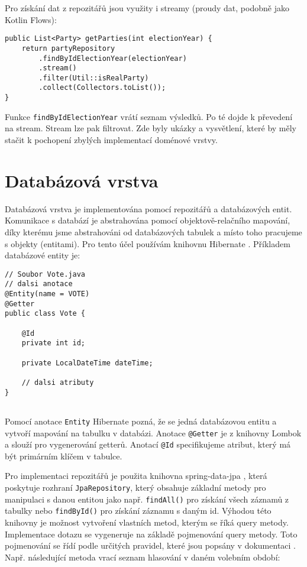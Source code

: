 \noindent Pro získání dat z repozitářů jsou využity i streamy (proudy dat, podobně jako Kotlin Flows):

\begin{lstlisting}[caption={Ukázka použití streamu}, tabsize=2]
public List<Party> getParties(int electionYear) {
	return partyRepository
		.findByIdElectionYear(electionYear)
		.stream()
		.filter(Util::isRealParty)
		.collect(Collectors.toList());
}
\end{lstlisting}

\noindent Funkce \lstinline|findByIdElectionYear| vrátí seznam výsledků. Po té dojde k převedení na stream. Stream lze pak filtrovat. Zde byly ukázky a vysvětlení, které by měly stačit k pochopení zbylých implementací doménové vrstvy.

\section {Databázová vrstva}
Databázová vrstva je implementována pomocí repozitářů a databázových entit. Komunikace \linebreak s databází je abstrahována pomocí objektově-relačního mapování, díky kterému jsme abstrahováni od databázových tabulek a místo toho pracujeme s objekty (entitami). Pro tento účel používám knihovnu Hibernate \cite{hibernate}. Příkladem databázové entity je:

\begin{lstlisting}[caption={Entita Vote reprezentující hlasování}, label={lst:vote-entity}, tabsize=2]
// Soubor Vote.java
// dalsi anotace
@Entity(name = VOTE)
@Getter
public class Vote {
	
	@Id
	private int id;
	
	private LocalDateTime dateTime;
	
	// dalsi atributy
}
	
\end{lstlisting}

\noindent Pomocí anotace \lstinline|Entity| Hibernate pozná, že se jedná databázovou entitu a vytvoří mapování na tabulku v databázi. Anotace \lstinline|@Getter| je z knihovny Lombok \cite{lombok} a slouží pro vygenerování getterů. Anotací \lstinline|@Id| specifikujeme atribut, který má být primárním klíčem v tabulce. 

Pro implementaci repozitářů je použita knihovna spring-data-jpa \cite{spring-jpa}, která poskytuje rozhraní \lstinline|JpaRepository|, který obsahuje základní metody pro manipulaci s danou entitou jako \linebreak např. \lstinline|findAll()| pro získání všech záznamů z tabulky nebo \lstinline|findById()| pro získání záznamu \linebreak s daným id. Výhodou této knihovny je možnost vytvoření vlastních metod, kterým se říká query metody. Implementace dotazu se vygeneruje na základě pojmenování query metody. Toto pojmenování se řídí podle určitých pravidel, které jsou popsány v dokumentaci \cite{spring-jpa}. Např. následující metoda vrací seznam hlasování v daném volebním období:

